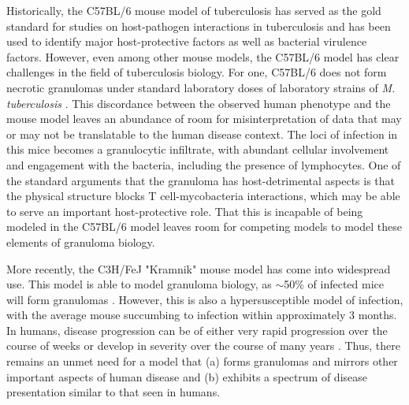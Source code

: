 Historically, the C57BL/6 mouse model of tuberculosis has served as the gold standard for studies on host-pathogen interactions in tuberculosis and has been used to identify major host-protective factors as well as bacterial virulence factors. However, even among other mouse models, the C57BL/6 model has clear challenges in the field of tuberculosis biology. For one, C57BL/6 does not form necrotic granulomas under standard laboratory doses of laboratory strains of \textit{M. tuberculosis} \citep{Orme1998}. This discordance between the observed human phenotype and the mouse model leaves an abundance of room for misinterpretation of data that may or may not be translatable to the human disease context. The loci of infection in this mice becomes a granulocytic infiltrate, with abundant cellular involvement and engagement with the bacteria, including the presence of lymphocytes. One of the standard arguments that the granuloma has host-detrimental aspects is that the physical structure blocks T cell-mycobacteria interactions, which may be able to serve an important host-protective role. That this is incapable of being modeled in the C57BL/6 model leaves room for competing models to model these elements of granuloma biology.

More recently, the C3H/FeJ "Kramnik" mouse model has come into widespread use. This model is able to model granuloma biology, as ${\sim}$50\% of infected mice will form granulomas \citep{Harper2012, Lenaerts2015}. However, this is also a hypersusceptible model of infection, with the average mouse succumbing to infection within approximately 3 months. In humans, disease progression can be of either very rapid progression over the course of weeks or develop in severity over the course of many years \citep{Tiemersma2011}. Thus, there remains an unmet need for a model that (a) forms granulomas and mirrors other important aspects of human disease and (b) exhibits a spectrum of disease presentation similar to that seen in humans. 

